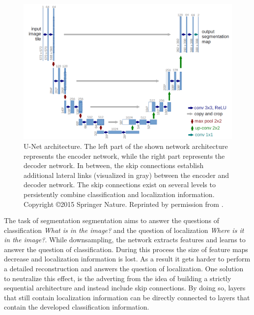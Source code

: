 \begin{figure}
	\includegraphics[width=\linewidth]{figures/chap223_unet.png}
	\caption[U-Net]{
		U-Net architecture. The left part of the shown network architecture represents the encoder network, while the right part represents the decoder network. 
		In between, the skip connections establish additional lateral links (visualized in gray) between the encoder and decoder network. 
		The skip connections exist on several levels to persistently combine classification and localization information. 
		Copyright \copyright 2015 Springer Nature. Reprinted by permission from \cite{RF15-U-Net}.}
	\label{fig:ch2:sec2:unet}
\end{figure}

The task of segmentation segmentation aims to answer the questions of classification \emph{What is in the image?} and the question of localization \emph{Where is it in the image?}.
While downsampling, the network extracts features and learns to answer the question of classification.
During this process the size of feature maps decrease and localization information is lost.
As a result it gets harder to perform a detailed reconstruction and answers the question of localization.
One solution to neutralize this effect, is the adverting from the idea of building a strictly sequential architecture and instead include skip connections.
By doing so, layers that still contain localization information can be directly connected to layers that contain the developed classification information.

